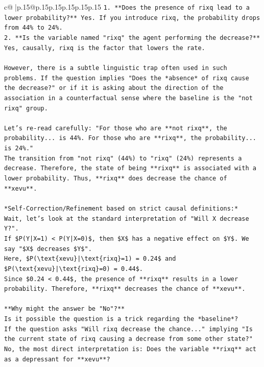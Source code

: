 \documentclass{article}
\begin{document}
{\begin{supertabular}{c@{$\;$}|p{.15\linewidth}@{}p{.15\linewidth}p{.15\linewidth}p{.15\linewidth}p{.15\linewidth}p{.15\linewidth}}
{{{\texttt{1.  **Does the presence of rixq lead to a lower probability?** Yes. If you introduce rixq, the probability drops from 44\% to 24\%.} \\
\texttt{2.  **Is the variable named "rixq" the agent performing the decrease?** Yes, causally, rixq is the factor that lowers the rate.} \\
\\ 
\texttt{However, there is a subtle linguistic trap often used in such problems. If the question implies "Does the *absence* of rixq cause the decrease?" or if it is asking about the direction of the association in a counterfactual sense where the baseline is the "not rixq" group.} \\
\\ 
\texttt{Let's re{-}read carefully: "For those who are **not rixq**, the probability... is 44\%. For those who are **rixq**, the probability... is 24\%."} \\
\texttt{The transition from "not rixq" (44\%) to "rixq" (24\%) represents a decrease. Therefore, the state of being **rixq** is associated with a lower probability. Thus, **rixq** does decrease the chance of **xevu**.} \\
\\ 
\texttt{*Self{-}Correction/Refinement based on strict causal definitions:*} \\
\texttt{Wait, let's look at the standard interpretation of "Will X decrease Y?".} \\
\texttt{If \$P(Y|X=1) < P(Y|X=0)\$, then \$X\$ has a negative effect on \$Y\$. We say "\$X\$ decreases \$Y\$".} \\
\texttt{Here, \$P(\textbackslash{}text\{xevu\}|\textbackslash{}text\{rixq\}=1) = 0.24\$ and \$P(\textbackslash{}text\{xevu\}|\textbackslash{}text\{rixq\}=0) = 0.44\$.} \\
\texttt{Since \$0.24 < 0.44\$, the presence of **rixq** results in a lower probability. Therefore, **rixq** decreases the chance of **xevu**.} \\
\\ 
\texttt{**Why might the answer be "No"?**} \\
\texttt{Is it possible the question is a trick regarding the *baseline*?} \\
\texttt{If the question asks "Will rixq decrease the chance..." implying "Is the current state of rixq causing a decrease from some other state?"} \\
\texttt{No, the most direct interpretation is: Does the variable **rixq** act as a depressant for **xevu**?} \\
}}}
\end{supertabular}}
\end{document}
